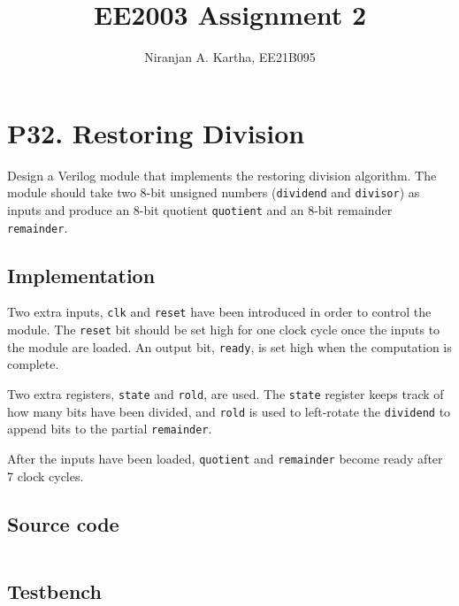 \documentclass[11pt]{article}
\title{EE2003 Assignment 2 \vspace{-1em}}
\author{Niranjan A. Kartha, EE21B095\vspace{-3em}}
\date{}
\renewcommand{\tt}[1]{\texttt{#1}}
\newenvironment{codeblock}{\captionsetup{type=codelisting}}{}
\begin{document}
\maketitle
\section*{P32. Restoring Division}
Design a Verilog module that implements the restoring division algorithm. The module should take two 8-bit unsigned numbers (\tt{dividend} and \tt{divisor}) as inputs and produce an 8-bit quotient \tt{quotient} and an 8-bit remainder \tt{remainder}.

\subsection*{Implementation}
Two extra inputs, \tt{clk} and \tt{reset} have been introduced in order to control the module. The \tt{reset} bit should be set high for one clock cycle once the inputs to the module are loaded. An output bit, \tt{ready}, is set high when the computation is complete.

Two extra registers, \tt{state} and \tt{rold}, are used. The \tt{state} register keeps track of how many bits have been divided, and \tt{rold} is used to left-rotate the \tt{dividend} to append bits to the partial \tt{remainder}.

After the inputs have been loaded, \tt{quotient} and \tt{remainder} become ready after 7 clock cycles.

\subsection*{Source code}

\begin{codeblock}
\inputminted[breaklines,
 mathescape,
 linenos,
 numbersep=5pt,
 frame=single,
 xleftmargin=0pt]{verilog}{divider/divider.srcs/sources_1/new/divider.v}
\end{codeblock}

\subsection*{Testbench}

\begin{codeblock}
\inputminted[breaklines,
 mathescape,
 linenos,
 numbersep=5pt,
 frame=single,
 xleftmargin=0pt]{verilog}{divider/divider.srcs/sim_1/new/divider_tb.v}
\end{codeblock}
\end{document}
